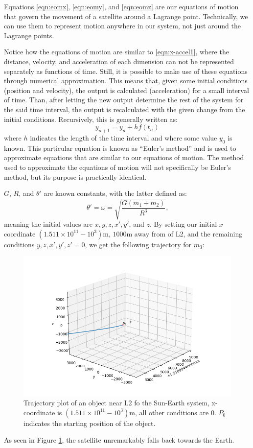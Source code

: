Equations \eqref{eqn:eomx}, \eqref{eqn:eomy}, and \eqref{eqn:eomz} are our equations of motion that govern the movement of a satellite around a Lagrange point.
Technically, we can use them to represent motion anywhere in our system, not just around the Lagrange points.

Notice how the equations of motion are similar to \eqref{eqn:x-accel1}, where the distance, velocity, and acceleration of each dimension can not be represented separately as functions of time.
Still, it is possible to make use of these equations through numerical approximation.
This means that, given some initial conditions (position and velocity), the output is calculated (acceleration) for a small interval of time.
Than, after letting the new output determine the rest of the system for the said time interval, the output is recalculated with the given change from the initial conditions.
Recursively, this is generally written as:
\begin{equation*}
	y_{n+1} = y_n + hf(t_n)
\end{equation*}
where $h$ indicates the length of the time interval and where some value $y_0$ is known.
This particular equation is known as ``Euler's method''\autocite{BrilEulers} and is used to approximate equations that are similar to our equations of motion.
The method used to approximate the equations of motion will not specifically be Euler's method, but its purpose is practically identical.

$G$, $R$, and $\theta'$ are known constants, with the latter defined as:
\begin{equation*}
	\theta' = \omega = \sqrt{\frac{G(m_1 + m_2)}{R^3}} \text{,}
\end{equation*}
meaning the initial values are $x, y, z, x', y'$, and $z$.
By setting our initial $x$ coordinate $(1.511\times10^{11} - 10^3)\si{\metre}$, $1000\si{\metre}$ away from of L2, and the remaining conditions $y, z, x', y', z' = 0$, we get the following trajectory for $m_3$:
\begin{figure}[H]
	\centering
	\includegraphics[scale=0.7]{3dplot1.png}
	\caption{Trajectory plot of an object near L2 fo the Sun-Earth system, x-coordinate is $(1.511\times10^{11} - 10^3)\si{\metre}$, all other conditions are 0. $P_0$ indicates the starting position of the object.}
	\label{fig:3dplot1}
\end{figure}
As seen in Figure \ref{fig:3dplot1}, the satellite unremarkably falls back towards the Earth.